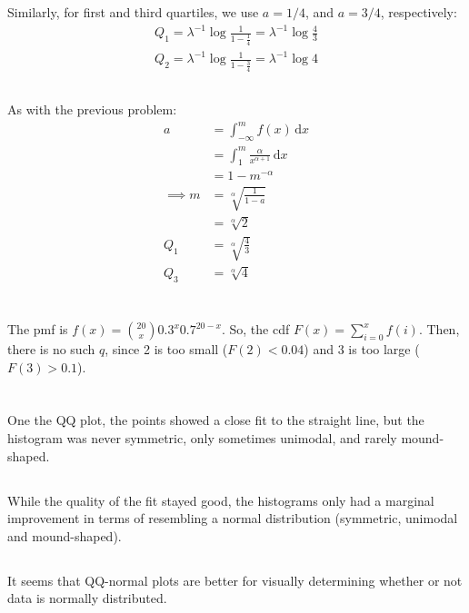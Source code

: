 \documentclass[twocolumn]{article}
\newcommand{\setsection}[1]{\setcounter{section}{#1}\addtocounter{section}{-1}\section{}}
\newcommand{\intg}[4]{\int_{#1}^{#2} \! #3 \, \mathrm{d}#4}
\begin{document}
Similarly, for first and third quartiles, we use $a=1/4$, and $a=3/4$, respectively:\begin{align*}
Q_1=\lambda^{-1}\log\frac{1}{1-\frac{1}{4}}=\lambda^{-1}\log\frac{4}{3}\\
Q_2=\lambda^{-1}\log\frac{1}{1-\frac{3}{4}}=\lambda^{-1}\log 4
\end{align*}

\subsection{}
As with the previous problem:\begin{align*}
a	& = \intg{-\infty}{m}{f(x)}{x}	\\
	&= \intg{1}{m}{\frac{\alpha }{x^{\alpha +1}}}{x} \\
	&= 1-m^{-\alpha}\\
\implies m &= \sqrt[\alpha]{\frac{1}{1-a}}\\
&= \sqrt[\alpha]{2} \\
Q_1 &= \sqrt[\alpha]{\frac{4}{3}}\\
Q_3 &= \sqrt[\alpha]{4}
\end{align*}

\setsection{13}
The pmf is $f(x)=\binom{20}{x}0.3^x0.7^{20-x}$. So, the cdf $F(x)=\sum_{i=0}^xf(i)$. Then, there is no such $q$, since 2 is too small ($F(2)<0.04$) and 3 is too large ($F(3)>0.1$).

\setsection{14}
\subsection{}
One the QQ plot, the points showed a close fit to the straight line, but the histogram was never symmetric, only sometimes unimodal, and rarely mound-shaped.
\subsection{}
While the quality of the fit stayed good, the histograms only had a marginal improvement in terms of resembling a normal distribution (symmetric, unimodal and mound-shaped).
\subsection{}
It seems that QQ-normal plots are better for visually determining whether or not data is normally distributed.
\end{document}

